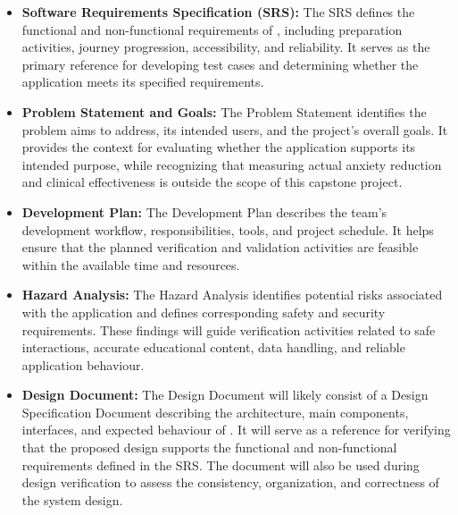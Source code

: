 \documentclass[10pt,titlepage]{article}
\begin{document}
\begin{itemize}
    \item \textbf{Software Requirements Specification (SRS):}
    The SRS \cite{SRS} defines the functional and
    non-functional requirements of \progname{}, including
    preparation activities, journey progression, accessibility,
    and reliability. It serves as the primary reference for
    developing test cases and determining whether the
    application meets its specified requirements.

    \item \textbf{Problem Statement and Goals:}
    The Problem Statement \cite{ProblemStatement} identifies the problem
    \progname{} aims to address, its intended users, and the
    project's overall goals. It provides the context for
    evaluating whether the application supports its intended
    purpose, while recognizing that measuring actual anxiety
    reduction and clinical effectiveness is outside the
    scope of this capstone project.

    \item \textbf{Development Plan:}
    The Development Plan \cite{DevPlan} describes the team's
    development workflow, responsibilities, tools, and
    project schedule. It helps ensure that the planned
    verification and validation activities are feasible
    within the available time and resources.

    \item \textbf{Hazard Analysis:}
    The Hazard Analysis \cite{HazardAnalysis} identifies potential
    risks associated with the application and defines
    corresponding safety and security requirements.
    These findings will guide verification activities
    related to safe interactions, accurate educational
    content, data handling, and reliable application
    behaviour.

    \item \textbf{Design Document:}
    The Design Document will likely consist of a Design
    Specification Document describing the architecture,
    main components, interfaces, and expected behaviour
    of \progname{}. It will serve as a reference for
    verifying that the proposed design supports the
    functional and non-functional requirements defined
    in the SRS. The document will also be used during
    design verification to assess the consistency,
    organization, and correctness of the system design.

\end{itemize}
\end{document}
